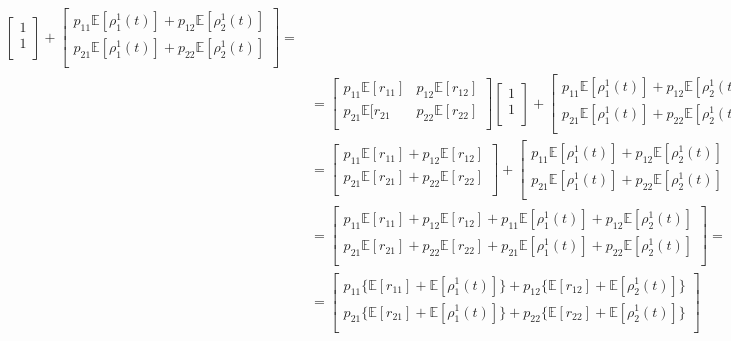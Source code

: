 \documentclass[\main/main.tex]{subfiles}
\begin{document}
\begin{equation}
\begin{split}
\begin{bmatrix}
 1\\
 1\\
 \end{bmatrix}
 + 
 \begin{bmatrix} 
 p_{11}\mathds{E}[\rho_1^1(t)] + p_{12}\mathds{E}[\rho_2^1(t)] \\
 p_{21}\mathds{E}[\rho_1^1(t)] + 
 p_{22}\mathds{E}[\rho_2^1(t)]\\
 \end{bmatrix} =\\
 &= 
 \begin{bmatrix} 
 p_{11}\mathds{E}[r_{11}] & p_{12}\mathds{E}[r_{12}]\\
 p_{21}\mathds{E}[r_{21} & 
 p_{22} \mathds{E}[r_{22}]\\
 \end{bmatrix}
  \begin{bmatrix}
 1\\
 1\\
 \end{bmatrix}
 + 
 \begin{bmatrix} 
 p_{11}\mathds{E}[\rho_1^1(t)] + p_{12}\mathds{E}[\rho_2^1(t)] \\
 p_{21}\mathds{E}[\rho_1^1(t)] + 
 p_{22}\mathds{E}[\rho_2^1(t)]\\
 \end{bmatrix} =\\
 &=  
 \begin{bmatrix} 
 p_{11}\mathds{E}[r_{11}]  +  p_{12}\mathds{E}[r_{12}]\\
 p_{21}\mathds{E}[r_{21}] + 
 p_{22} \mathds{E}[r_{22}]\\
 \end{bmatrix}
 + 
 \begin{bmatrix} 
 p_{11}\mathds{E}[\rho_1^1(t)] + p_{12}\mathds{E}[\rho_2^1(t)] \\
 p_{21}\mathds{E}[\rho_1^1(t)] + 
 p_{22}\mathds{E}[\rho_2^1(t)]\\
 \end{bmatrix} =\\
 &=  
 \begin{bmatrix} 
 p_{11}\mathds{E}[r_{11}]  +  p_{12}\mathds{E}[r_{12}] + p_{11}\mathds{E}[\rho_1^1(t)] + p_{12}\mathds{E}[\rho_2^1(t)]\\
 p_{21}\mathds{E}[r_{21}] + 
 p_{22} \mathds{E}[r_{22}] + p_{21}\mathds{E}[\rho_1^1(t)] + 
 p_{22}\mathds{E}[\rho_2^1(t)]\\
 \end{bmatrix} =\\
 &=  
 \begin{bmatrix} 
 p_{11} \big\{ \mathds{E}[r_{11}]  + \mathds{E}[\rho_1^1(t)]\big\} + p_{12}\big\{ \mathds{E}[r_{12}]  + \mathds{E}[\rho_2^1(t)]\big\}\\
  p_{21} \big\{ \mathds{E}[r_{21}]  + \mathds{E}[\rho_1^1(t)]\big\} + p_{22}\big\{ \mathds{E}[r_{22}]  + \mathds{E}[\rho_2^1(t)]\big\} \\
 \end{bmatrix}
\end{split}
\end{equation}
\end{document}
